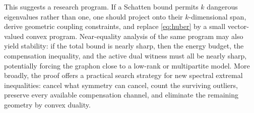 \documentclass[10pt]{article}
\begin{document}
This suggests a research program.  If a Schatten bound permits $k$ dangerous eigenvalues rather than one, one should project onto their $k$-dimensional span, derive geometric coupling constraints, and replace \eqref{eq:huber} by a small vector-valued convex program.  Near-equality analysis of the same program may also yield stability: if the total bound is nearly sharp, then the energy budget, the compensation inequality, and the active dual witness must all be nearly sharp, potentially forcing the graphon close to a low-rank or multipartite model.  More broadly, the proof offers a practical search strategy for new spectral extremal inequalities: cancel what symmetry can cancel, count the surviving outliers, preserve every available compensation channel, and eliminate the remaining geometry by convex duality.
\end{document}
